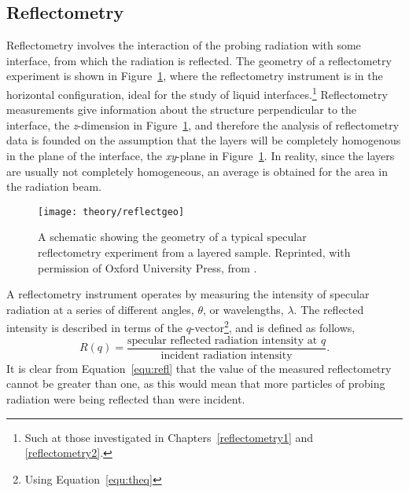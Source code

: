 \subsection{Reflectometry}
\label{sec:refltheory}

Reflectometry involves the interaction of the probing radiation with some interface, from which the radiation is reflected.
The geometry of a reflectometry experiment is shown in Figure~\ref{fig:refgeo}, where the reflectometry instrument is in the horizontal configuration, ideal for the study of liquid interfaces.\footnote{Such at those investigated in Chapters~\ref{reflectometry1} and \ref{reflectometry2}.}
Reflectometry measurements give information about the structure perpendicular to the interface, the \emph{z}-dimension in Figure~\ref{fig:refgeo}, and therefore the analysis of reflectometry data is founded on the assumption that the layers will be completely homogenous in the plane of the interface, the \emph{xy}-plane in Figure~\ref{fig:refgeo}.
In reality, since the layers are usually not completely homogeneous, an average is obtained for the area in the radiation beam.
%
\begin{figure}
    \centering
    \texttt{[image: theory/reflectgeo]}
    \caption{A schematic showing the geometry of a typical specular reflectometry experiment from a layered sample. Reprinted, with permission of Oxford University Press, from \cite{sivia_elementary_2011}.}
    \label{fig:refgeo}
\end{figure}
%

A reflectometry instrument operates by measuring the intensity of specular radiation at a series of different angles, $\theta$, or wavelengths, $\lambda$.
The reflected intensity is described in terms of the $q$-vector\footnote{Using Equation~\ref{equ:theq}}, and is defined as follows,
%
\begin{equation}
    R(q) = \frac{\text{specular reflected radiation intensity at }q}{\text{incident radiation intensity}}.
    \label{equ:refl}
\end{equation}
%
It is clear from Equation~\ref{equ:refl} that the value of the measured reflectometry cannot be greater than one, as this would mean that more particles of probing radiation were being reflected than were incident.

